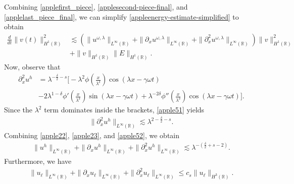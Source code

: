 \documentclass[12pt,reqno]{amsart}
\newcommand{\rr}{\mathbb{R}}
\newcommand{\p}{\partial}
\theoremstyle{plain}  %
\theoremstyle{definition}
\begin{document}
Combining \eqref{applefirst_piece}, \eqref{applesecond-piece-final},
and \eqref{applelast_piece_final}, we can
simplify \eqref{appleenergy-estimate-simplified} to obtain
\begin{equation}
	\begin{split}
		\label{appleenergy-estimate-best}
		\frac{d}{dt} \|v(t)\|_{H^1(\rr)}^2
		& \lesssim \left( \|u^{\omega,\lambda}\|_{L^\infty(\rr)} + \|
		\p_x u^{\omega,\lambda} \|_{L^\infty(\rr)} + \|\p_x^2 u^{\omega,\lambda} \|_{L^\infty (\rr)} \right)
		\|v\|_{H^1(\rr)}^2 
		\\
		&+ \|v\|_{H^1(\rr)} \|E\|_{H^1(\rr)}.
	\end{split}
\end{equation}
Now, observe that
\begin{equation}
	\begin{split}
		\p_x^2 u^h 
		& = \lambda^{-\frac{\delta}{2}-s} \Big[ - \lambda^2 \phi\left(
		\frac{x}{\lambda^\delta} \right ) \cos(\lambda x - \gamma \omega t) \\
		& - 2\lambda^{1 -\delta } \phi'\left( \frac{x}{\lambda^\delta}
		\right )
		\sin(\lambda x - \gamma \omega t ) + \lambda^{-2\delta} \phi''\left(
		\frac{x}{\lambda^\delta} \right) \cos (\lambda x - \gamma \omega t) \Big].
		\label{apple51}
	\end{split}
\end{equation}
Since the $\lambda^2$ term dominates inside the brackets, \eqref{apple51} yields
\begin{equation}
	\begin{split}
		\|\p_x^2 u^h \|_{L^\infty(\rr)} \lesssim
		\lambda^{2-\frac{\delta}{2}-s}.
		\label{apple52}
	\end{split}
\end{equation}
Combining \eqref{apple22}, \eqref{apple23}, and \eqref{apple52}, we obtain
\begin{equation}
	\begin{split}
		\|u^h\|_{L^\infty(\rr)} + \|\p_x u^h\|_{L^\infty(\rr)} + \|\p_x^2
		u^h\|_{L^\infty(\rr)} \lesssim \lambda^{-\left(
		\frac{\delta}{2} + s -2 \right)}.
		\label{apple53}
	\end{split}
\end{equation}
Furthermore, we have
\begin{equation}
	\begin{split}
		\|u_\ell\|_{L^\infty(\rr)} + \|\p_x u_\ell \|_{L^\infty(\rr)} + \|\p_x^2
		u_\ell\|_{L^\infty(\rr)} \le c_s \|u_\ell\|_{H^3(\rr)}.
		\label{apple54}
	\end{split}
\end{equation}
\end{document}

